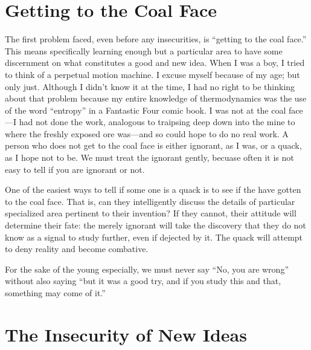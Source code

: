 \documentclass[
	fontsize=10pt, %
	twoside=false, %
	secnumdepth=1, %
]{kaobook}
\begin{document}
\section{Getting to the Coal Face}

The first problem faced, even before any insecurities,
is ``getting to the coal face.''
This means specifically learning enough but a particular
area to have some discernment on what constitutes a good and new idea.
When I was a boy, I tried to think of a perpetual motion machine.
I excuse myself because of my age; but only just.
Although I didn't know it at the time, I had no right to be
thinking about that problem because my entire knowledge of
thermodynamics was the use of the word ``entropy'' in a Fantastic Four comic book.
I was not at the coal face---I had not done the work, analogous to traipsing
deep down into the mine to where the freshly exposed ore was---and so could
hope to do no real work.
A person who does not get to the coal face is either ignorant,
as I was, or a quack, as I hope not to be.
We must treat the ignorant gently, becuase often it is not
easy to tell if you are ignorant or not.

One of the easiest ways to tell if some one is a quack is
to see if the have gotten to the coal face.
That is, can they intelligently discuss the details
of particular specialized area pertinent to their invention?
If they cannot, their attitude will determine their fate:
the merely ignorant will take the discovery that they
do not know as a signal to study further, even if dejected by it.
The quack will attempt to deny reality and become combative.

For the sake of the young especially, we must never say
``No, you are wrong'' without also saying ``but it was
a good try, and if you study this and that, something may come of it.''


\section{The Insecurity of New Ideas}
\end{document}
